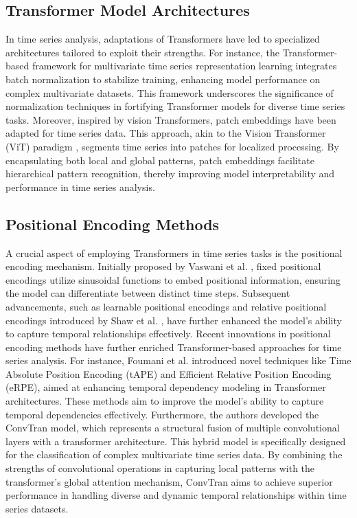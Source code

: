 \subsection{Transformer Model Architectures}
In time series analysis, adaptations of Transformers have led to specialized architectures tailored to exploit their strengths. For instance, the Transformer-based framework for multivariate time series representation learning \cite{zerveas2021transformer} integrates batch normalization to stabilize training, enhancing model performance on complex multivariate datasets. This framework underscores the significance of normalization techniques in fortifying Transformer models for diverse time series tasks. Moreover, inspired by vision Transformers, patch embeddings have been adapted for time series data. This approach, akin to the Vision Transformer (ViT) paradigm \cite{cordonnier2021differentiable}, segments time series into patches for localized processing. By encapsulating both local and global patterns, patch embeddings facilitate hierarchical pattern recognition, thereby improving model interpretability and performance in time series analysis.


\subsection{Positional Encoding Methods}
A crucial aspect of employing Transformers in time series tasks is the positional encoding mechanism. Initially proposed by Vaswani et al. \cite{vaswani2017attention}, fixed positional encodings utilize sinusoidal functions to embed positional information, ensuring the model can differentiate between distinct time steps. Subsequent advancements, such as learnable positional encodings and relative positional encodings introduced by Shaw et al. \cite{shaw2018self}, have further enhanced the model's ability to capture temporal relationships effectively. Recent innovations in positional encoding methods have further enriched Transformer-based approaches for time series analysis.
For instance, Foumani et al. \cite{foumani2024improving} introduced novel techniques like Time Absolute Position Encoding (tAPE) and Efficient Relative Position Encoding (eRPE), aimed at enhancing temporal dependency modeling in Transformer architectures. These methods aim to improve the model's ability to capture temporal dependencies effectively.
Furthermore, the authors developed the ConvTran model, which represents a structural fusion of multiple convolutional layers with a transformer architecture. This hybrid model is specifically designed for the classification of complex multivariate time series data. By combining the strengths of convolutional operations in capturing local patterns with the transformer's global attention mechanism, ConvTran aims to achieve superior performance in handling diverse and dynamic temporal relationships within time series datasets.

